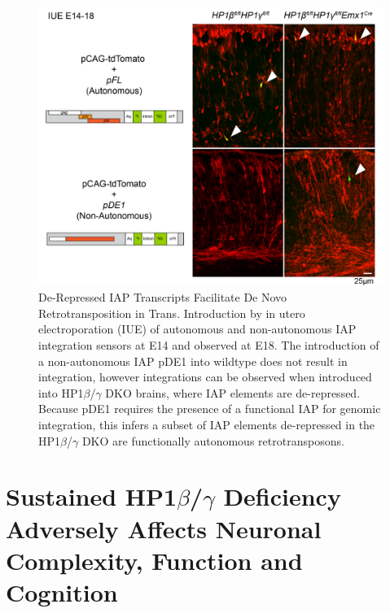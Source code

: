 \documentclass[onehalf,12pt]{beavtex}
\begin{document}
  \begin{figure}
  
  {\centering \includegraphics[width=1\linewidth, ]{./figure/results/IAPIUE} 
  
  }
  
  \caption[De-Repressed IAP Transcripts Facilitate De Novo Retrotransposition in Trans ]{De-Repressed IAP Transcripts Facilitate De Novo Retrotransposition in Trans. Introduction by in utero electroporation (IUE) of autonomous and non-autonomous IAP integration sensors at E14 and observed at E18.  The introduction of a non-autonomous IAP pDE1 into wildtype does not result in integration, however integrations can be observed when introduced into HP1$\beta$/$\gamma$ DKO brains, where IAP elements are de-repressed.  Because pDE1 requires the presence of a functional IAP for genomic integration, this infers a subset of IAP elements de-repressed in the HP1$\beta$/$\gamma$ DKO are functionally autonomous retrotransposons.}\label{fig:IAPIUE}
  \end{figure}
  
  \FloatBarrier
  
  \section{\texorpdfstring{Sustained HP1\(\beta\)/\(\gamma\) Deficiency
  Adversely Affects Neuronal Complexity, Function and
  Cognition}{Sustained HP1\textbackslash{}beta/\textbackslash{}gamma Deficiency Adversely Affects Neuronal Complexity, Function and Cognition}}\label{sustained-hp1betagamma-deficiency-adversely-affects-neuronal-complexity-function-and-cognition}
  
\end{document}
